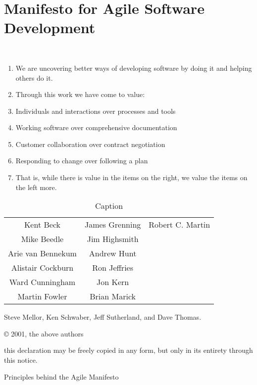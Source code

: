 \section{Manifesto for Agile Software Development}~\label{sec:manifesto-for-agile-software-development}

\begin{enumerate}
    \item We are uncovering better ways of developing software by doing it and helping others do it.
    \item Through this work we have come to value:

    \item Individuals and interactions over processes and tools
    \item Working software over comprehensive documentation
    \item Customer collaboration over contract negotiation
    \item Responding to change over following a plan

    \item That is, while there is value in the items on the right, we value the items on the left more.
\end{enumerate}

\begin{table}[]
    \centering
    \begin{tabular}{ccc}
       Kent Beck         & James Grenning & Robert C. Martin \\
       Mike Beedle       & Jim Highsmith  & \\
       Arie van Bennekum & Andrew Hunt    & \\
       Alistair Cockburn & Ron Jeffries   & \\
       Ward Cunningham   & Jon Kern       & \\
       Martin Fowler     & Brian Marick   & \\
    \end{tabular}
    \caption{Caption}
    \label{tab:agile-manifesto-contributors}
\end{table}




Steve Mellor, 
Ken Schwaber, 
Jeff Sutherland, and 
Dave Thomas.


© 2001, the above authors

this declaration may be freely copied in any form,
but only in its entirety through this notice.

Principles behind the Agile Manifesto

